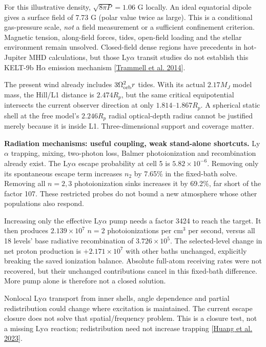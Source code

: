 \documentclass[10pt,a4paper]{article}
\begin{document}
For this illustrative density, $\sqrt{8\pi P}=1.06$ G locally. An ideal
equatorial dipole gives a surface field of 7.73 G (polar value twice as
large). This is a conditional gas-pressure scale, \emph{not} a field
measurement or a sufficient confinement criterion. Magnetic tension,
along-field forces, tides, open-field loading and the stellar environment
remain unsolved. Closed-field dense regions have precedents in hot-Jupiter
MHD calculations, but those Ly$\alpha$ transit studies do not establish this
KELT-9b H$\alpha$ emission mechanism
[\href{https://arxiv.org/abs/1404.5817}{Trammell et al. 2014}].

The present wind already includes $3\Omega_{\rm orb}^2r$ tides. With its
actual $2.17M_J$ model mass, the Hill/L1 distance is $2.474R_p$, but the
same critical equipotential intersects the current observer direction at
only $1.814$--$1.867R_p$. A spherical static shell at the free model's
$2.246R_p$ radial optical-depth radius cannot be justified merely because
it is inside L1. Three-dimensional support and coverage matter.

\textbf{Radiation mechanisms: useful coupling, weak stand-alone shortcuts.}
Ly$\alpha$ trapping, mixing, two-photon loss, Balmer photoionization and
recombination already exist. The Ly$\alpha$ escape probability at cell 5 is
$5.82\times10^{-6}$. Removing only its spontaneous escape term increases
$n_2$ by 7.65\% in the fixed-bath solve. Removing all $n=2,3$ photoionization
sinks increases it by 69.2\%, far short of the factor 107. These restricted
probes do not bound a new atmosphere whose other populations also respond.

Increasing only the effective Ly$\alpha$ pump needs a factor 3424 to reach
the target. It then produces $2.139\times10^7$ $n=2$ photoionizations per
$\mathrm{cm}^3$ per second, versus all 18 levels' base radiative recombination
of $3.726\times10^5$. The selected-level change in net proton production is
$+2.171\times10^7$ with other baths unchanged, explicitly breaking the saved
ionization balance. Absolute full-atom receiving rates were not recovered,
but their unchanged contributions cancel in this fixed-bath difference.
More pump alone is therefore not a closed solution.

Nonlocal Ly$\alpha$ transport from inner shells, angle dependence and partial
redistribution could change where excitation is maintained. The current
escape closure does not solve that spatial/frequency problem. This is a
closure test, not a missing Ly$\alpha$ reaction; redistribution need not
increase trapping [\href{https://arxiv.org/html/2304.07352v1#S2.SS7}{Huang et al. 2023}].
\end{document}

